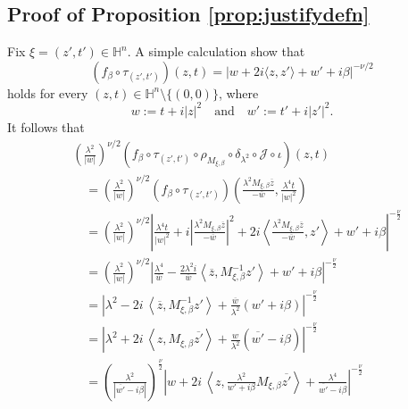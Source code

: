 \documentclass[reqno]{amsart}
\theoremstyle{definition}
\theoremstyle{remark}
\numberwithin{equation}{section}
\begin{document}
\subsection{Proof of Proposition \ref{prop:justifydefn}}
\label{subsec:Pf_justified}

Fix $\xi=(z',t')\in \mathbb{H}^n$. A simple calculation show that
\begin{equation}\label{eqn:fbetacomptau}
\left( f_\beta \circ \tau_{(z',t')}\right)(z,t)
=\left|w +  2i\langle z, z' \rangle + w' + i\beta\right|^{-\nu/2}
\end{equation}
holds for every $(z,t)\in \mathbb{H}^n\setminus \{(0,0)\}$, where
\[
w:=t + i|z|^2  \quad \text{and} \quad w':= t' + i\left|z'\right|^2.
\]
It follows that
\begin{align*}
& \left(\frac{\lambda^{2}}{|w|}\right)^{\nu/2} 
\left(f_\beta \circ \tau_{(z',t')} \circ \rho_{M_{\xi,\beta}} \circ \delta_{\lambda^{2}}
\circ \mathscr{J} \circ \iota \right) (z,t)\\
& \quad = \left(\frac{\lambda^{2}}{|w|}\right)^{\nu/2} \left( f_\beta \circ \tau_{(z',t')}\right)
\left(\frac {\lambda^2 M_{\xi,\beta} \overline{z}} {-\overline{w}},
\frac {\lambda^4 t} {|w|^2} \right)\\
& \quad =  \left(\frac{\lambda^{2}}{|w|}\right)^{\nu/2} \left| \frac {\lambda^4 t} {|w|^2} +
i\left| \frac {\lambda^2 M_{\xi,\beta} \overline{z}} {-\overline{w}}\right|^{2}
+2i \left\langle \frac {\lambda^2 M_{\xi,\beta} \overline{z}} {-\overline{w}}, z'\right\rangle 
+ w' + i\beta \right|^{-\frac{\nu}{2}}\\
&\quad = \left(\frac{\lambda^{2}}{|w|}\right)^{\nu/2}
\left| \frac{\lambda^{4}}{\overline{w}} - \frac{2 \lambda^{2} i}{\overline{w}}
\left\langle \overline{z}, M_{\xi,\beta}^{-1} z' \right\rangle + w' 
+ i\beta\right|^{-\frac{\nu}{2}}\\
&\quad =\left|\lambda^{2}- 2 i\, \left\langle \overline{z}, M_{\xi,\beta}^{-1} z' \right\rangle + \frac{\overline{w}}{\lambda^{2}} \left(w' + i\beta\right)\right|^{-\frac{\nu}{2}} \\
&\quad =\left|\lambda^{2} + 2 i\, \left\langle z, M_{\xi,\beta} \overline{z'} \right\rangle + \frac{w}{\lambda^{2}} \left(\overline{w'} - i\beta\right)\right|^{-\frac{\nu}{2}} \\
&\quad =\left(\frac{\lambda^{2}}{\left|\overline{w'}-i\beta\right|}\right)^{\frac{\nu}{2}}
\left| w + 2i \,\left\langle z, \frac {\lambda^{2}}{w'+i\beta} M_{\xi,\beta} \overline{z'} \right\rangle + \frac{\lambda^4}{\overline{w'}-i\beta}\right|^{-\frac{\nu}{2}}
\end{align*}
\end{document}
